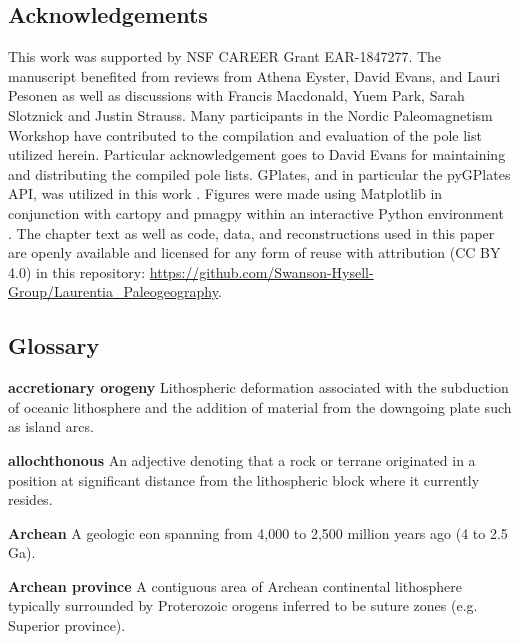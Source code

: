 \documentclass[twocolumn, switch]{article} %
\begin{document}

\footnotesize
\subsection*{Acknowledgements}
This work was supported by NSF CAREER Grant EAR-1847277. The manuscript benefited from reviews from Athena Eyster, David Evans, and Lauri Pesonen as well as discussions with Francis Macdonald, Yuem Park, Sarah Slotznick and Justin Strauss. Many participants in the Nordic Paleomagnetism Workshop have contributed to the compilation and evaluation of the pole list utilized herein. Particular acknowledgement goes to David Evans for maintaining and distributing the compiled pole lists. GPlates, and in particular the pyGPlates API, was utilized in this work \citep{Muller2018b}. Figures were made using Matplotlib \citep{Hunter2007a} in conjunction with cartopy \citep{Met-Office2010a} and pmagpy \citep{Tauxe2016a} within an interactive Python environment \citep{Perez2007a}. The chapter text as well as code, data, and reconstructions used in this paper are openly available and licensed for any form of reuse with attribution (CC BY 4.0) in this repository: \url{https://github.com/Swanson-Hysell-Group/Laurentia_Paleogeography}.

\subsection*{Glossary}
\noindent\textbf{accretionary orogeny } Lithospheric deformation associated with the subduction of oceanic lithosphere and the addition of material from the downgoing plate such as island arcs.

\noindent\textbf{allochthonous } An adjective denoting that a rock or terrane originated in a position at significant distance from the lithospheric block where it currently resides.

\noindent\textbf{Archean } A geologic eon spanning from 4,000 to 2,500 million years ago (4 to 2.5 Ga).

\noindent\textbf{Archean province } A contiguous area of Archean continental lithosphere typically surrounded by Proterozoic orogens inferred to be suture zones (e.g. Superior province).
\end{document}
